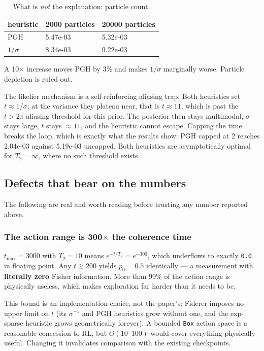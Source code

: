\documentclass[12pt,a4paper]{article}
\begin{document}
\begin{table}[H]
  \centering
  \caption{What is \emph{not} the explanation: particle count.}
  \label{tab:what-is-not-the-explanation-particle-count}
  \begin{tabular}{lll}
  \toprule
  heuristic & \num{2000} particles & \num{20000} particles \\
  \midrule
  PGH & 5.47e-03 & 5.32e-03 \\
  $1/\sigma$ & 8.34e-03 & 9.22e-03 \\
  \bottomrule
  \end{tabular}
\end{table}
A 10$\times$ increase moves PGH by 3\% and makes $1/\sigma$ marginally worse. Particle depletion is ruled out.

The likelier mechanism is a self-reinforcing aliasing trap. Both heuristics set $t \approx 1/\sigma$; at the variance they plateau near, that is $t \approx 11$, which is past the $t > 2\pi$ aliasing threshold for this prior. The posterior then stays multimodal, $\sigma$ stays large, $t$ stays $\approx 11$, and the heuristic cannot escape. Capping the time breaks the loop, which is exactly what the results show: PGH capped at 2 reaches 2.04e-03 against 5.19e-03 uncapped. Both heuristics are asymptotically optimal for $T_2 = \infty$, where no such threshold exists.

\FloatBarrier
\subsection{Defects that bear on the numbers}\label{sec:defects-that-bear-on-the-numbers}
The following are real and worth reading before trusting any number reported above.

\subsubsection{The action range is 300\texorpdfstring{$\times$}{x} the coherence time}\label{sec:2-the-action-range-is-300-the-coherence-time}
$t_{\max} = 3000$ with $T_2 = 10$ means $e^{-t/T_2} = e^{-300}$, which underflows to exactly \texttt{0.\allowbreak{}0} in floating point. Any $t \gtrsim 200$ yields $p_0 = 0.5$ identically --- a measurement with \textbf{literally zero} Fisher information. More than 99\% of the action range is physically useless, which makes exploration far harder than it needs to be.

This bound is an implementation choice, not the paper's: Fiderer imposes no upper limit on $t$ (its $\sigma^{-1}$ and PGH heuristics grow without one, and the exp-sparse heuristic grows geometrically forever). A bounded \texttt{Box} action space is a reasonable concession to RL, but $O(10\text{--}100)$ would cover everything physically useful. Changing it invalidates comparison with the existing checkpoints.
\end{document}
